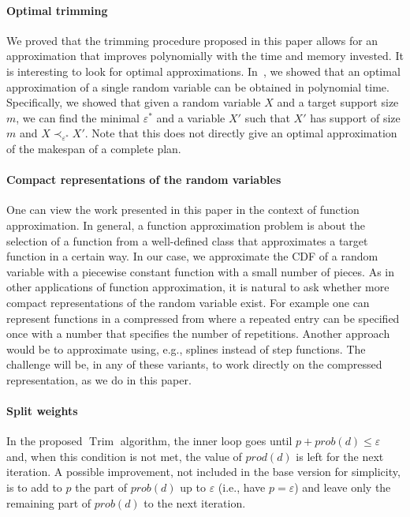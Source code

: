 \documentclass[review]{elsarticle}
\DeclareMathOperator{\Trim}{Trim}
\begin{document}
\paragraph{Optimal trimming}  We proved that the trimming procedure proposed in this paper allows for an approximation that improves polynomially with the time and memory invested. It is interesting to look for optimal approximations. In~\cite{cohen2018}, we showed that an optimal approximation of a single random variable can be obtained in polynomial time. Specifically, we showed that given a random variable $X$ and a target support size $m$, we can find the minimal $\varepsilon^*$ and a variable $X'$ such that $X'$ has support of size $m$ and $X \prec_{\varepsilon^*} X'$. Note that this does not directly give an optimal approximation of the makespan of a complete plan.

\paragraph{Compact representations of the random variables} One can view the work presented in this paper in the context of function approximation. In general, a function approximation problem is about the selection of a function from a well-defined class that approximates a target function in a certain way. In our case, we approximate the CDF of a random variable with a piecewise constant function with a small number of pieces. As in other applications of function approximation, it is natural to ask whether more compact representations of the random variable exist. For example one can represent functions in a compressed from where a repeated entry can be specified once with a number that specifies the number of repetitions. Another approach would be to approximate using, e.g., splines instead of step functions. The challenge will be, in any of these variants, to work directly on the compressed representation, as we do in this paper.

\paragraph{Split weights} In the proposed $\Trim$ algorithm, the inner loop goes until $p+prob(d) \leq \varepsilon$ and, when this condition is not met, the value of $prod(d)$ is left for the next iteration. A possible improvement, not included in the base version for simplicity, is to add to $p$ the part of $prob(d)$ up to $\varepsilon$ (i.e., have $p=\varepsilon$) and leave only the remaining part of $prob(d)$ to the next iteration.
\end{document}
